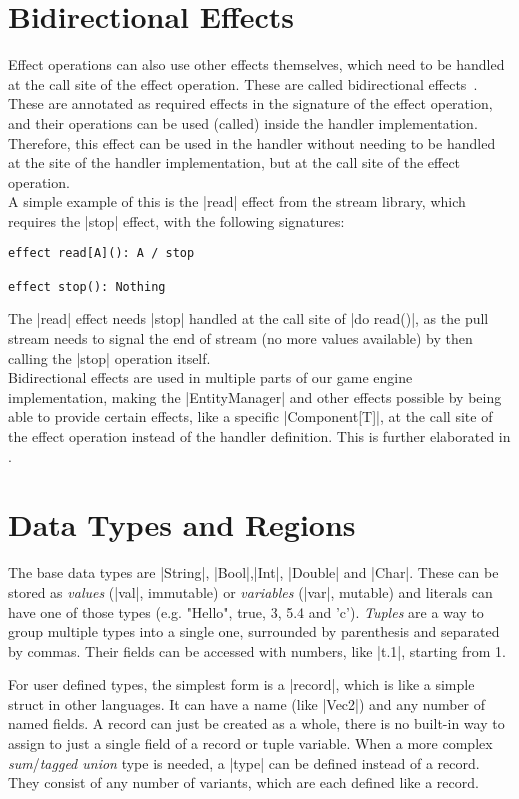 \section{Bidirectional Effects}

Effect operations can also use other effects themselves, which need to be handled at the call site of the effect operation. These are called bidirectional effects~\cite{zhang2020bidirectional}. These are annotated as required effects in the signature of the effect operation, and their operations can be used (called) inside the handler implementation. Therefore, this effect can be used in the handler without needing to be handled at the site of the handler implementation, but at the call site of the effect operation.\\
A simple example of this is the |read| effect from the stream library, which requires the |stop| effect, with the following signatures:

\begin{lstlisting}
effect read[A](): A / stop

effect stop(): Nothing
\end{lstlisting}

The |read| effect needs |stop| handled at the call site of |do read()|, as the pull stream needs to signal the end of stream (no more values available) by then calling the |stop| operation itself.\\
Bidirectional effects are used in multiple parts of our game engine implementation, making the |EntityManager| and other effects possible by being able to provide certain effects, like a specific |Component[T]|, at the call site of the effect operation instead of the handler definition. This is further elaborated in .

\section{Data Types and Regions}

The base data types are |String|, |Bool|,|Int|, |Double| and |Char|. These can be stored as \textit{values} (|val|, immutable) or \textit{variables} (|var|, mutable) and literals can have one of those types (e.g. "Hello", true, 3, 5.4 and 'c'). \textit{Tuples} are a way to group multiple types into a single one, surrounded by parenthesis and separated by commas. Their fields can be accessed with numbers, like |t.1|, starting from 1.

For user defined types, the simplest form is a |record|, which is like a simple struct in other languages. It can have a name (like |Vec2|) and any number of named fields. A record can just be created as a whole, there is no built-in way to assign to just a single field of a record or tuple variable. When a more complex \textit{sum}/\textit{tagged union} type is needed, a |type| can be defined instead of a record. They consist of any number of variants, which are each defined like a record.

